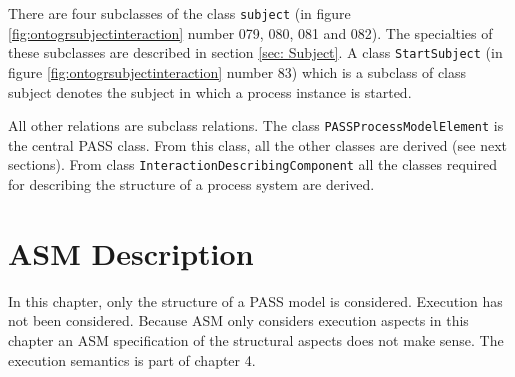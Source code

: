 There are four subclasses of the class \texttt{subject} (in figure \ref{fig:ontogrsubjectinteraction} number 079, 080, 081 and 082). The specialties of these subclasses are described in section \ref{sec: Subject}. A class \texttt{StartSubject} (in figure \ref{fig:ontogrsubjectinteraction} number 83) which is a subclass of class subject denotes the subject in which a process instance is started.

All other relations are subclass relations. The class \texttt{PASSProcessModelElement} is the central PASS class. From this class, all the other classes are derived (see next sections). From class \texttt{InteractionDescribingComponent} all the classes required for describing the structure of a process system are derived.

\section{ASM Description}

In this chapter, only the structure of a PASS model is considered. Execution has not been considered. Because ASM only considers execution aspects in this chapter an ASM specification of the structural aspects does not make sense. The execution semantics is part of chapter 4.
